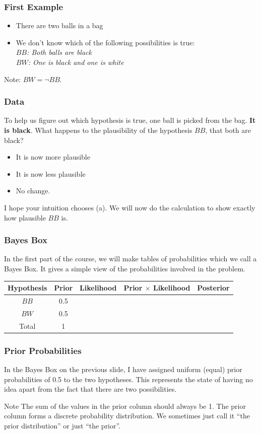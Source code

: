 \documentclass{beamer}
\begin{document}
\begin{frame}
\frametitle{First Example}
\begin{itemize}
\item There are two balls in a bag \pause
\item We don't know which of the following possibilities is true:\\\pause
{\em $BB$: Both balls are black}\\
{\em $BW$: One is black and one is white}
\end{itemize}\pause

Note: $BW = \neg BB$.
\end{frame}


\begin{frame}
\frametitle{Data}
To help us figure out which hypothesis is true, one ball is picked
from the bag. {\bf It is black}. What happens to the plausibility of
the hypothesis $BB$, that both are black?\pause

\begin{itemize}
\item[(a)] It is now more plausible
\item[(b)] It is now less plausible
\item[(c)] No change.
\end{itemize}\pause

I hope your intuition chooses (a). We will now do the calculation to
show exactly how plausible $BB$ is.


\end{frame}


\begin{frame}
\frametitle{Bayes Box}
In the first part of the course, we will make tables of probabilities
which we call a Bayes Box. It gives a simple view of the probabilities
involved in the problem.\\[0.5em]\pause

\begin{tabular}{|c|c|c|c|c|}
\hline
Hypothesis & Prior & Likelihood & Prior $\times$ Likelihood & Posterior \\
\hline
$BB$ & 0.5 & & & \\
$BW$ & 0.5 & & & \\
\hline
Total & 1 & & & \\
\hline
\end{tabular}

\end{frame}


\begin{frame}
\frametitle{Prior Probabilities}
In the Bayes Box on the previous slide, I have assigned uniform (equal)
prior probabilities of 0.5 to the two hypotheses. This represents the state
of having no idea apart from the fact that there are two possibilities.\pause

\begin{alertblock}{Note}
The sum of the values in the prior column should always be 1.
The prior column forms a discrete probability distribution.
We sometimes just call it ``the prior distribution'' or just ``the prior''.
\end{alertblock}


\end{frame}
\end{document}
